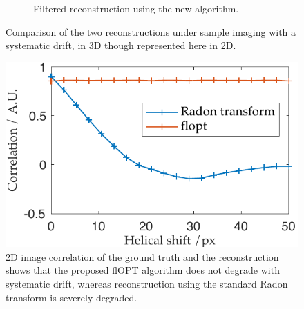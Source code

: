 \begin{figure}
\begin{subfigure}[t]{0.4\textwidth}
    \caption{Filtered reconstruction using the new algorithm.}\label{fig:filtered_recon_helix}
  \end{subfigure}
  \caption{Comparison of the two reconstructions under sample imaging with a systematic drift, in 3D though represented here in 2D.}\label{fig:flopts}
\end{figure}

\begin{figure}
  \centering
  \includegraphics{Chapters/flopt/Figs/PDF/results/correlation_helicity}
  \caption{%
  2D image correlation of the ground truth and the reconstruction shows that the proposed flOPT algorithm does not degrade with systematic drift, whereas reconstruction using the standard \gls{Radon transform} is severely degraded.
  }\label{fig:helical_comparison}
\end{figure}

